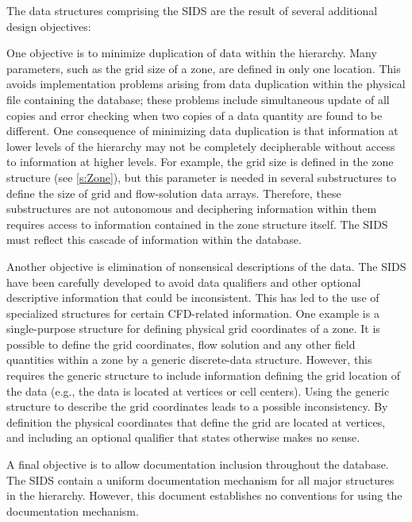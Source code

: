 The data structures comprising the SIDS are the result of several
additional design objectives:

One objective is to minimize duplication of data within the hierarchy.
Many parameters, such as the grid size of a zone, are defined in only
one location.  This avoids implementation problems arising from data
duplication within the physical file containing the database; these
problems include simultaneous update of all copies and error checking
when two copies of a data quantity are found to be different.  One
consequence of minimizing data duplication is that information at lower
levels of the hierarchy may not be completely decipherable without
access to information at higher levels.  For example, the grid size
is defined in the zone structure (see \autoref{s:Zone}), but this
parameter is needed in several substructures to define the size of grid
and flow-solution data arrays.  Therefore, these substructures are not
autonomous and deciphering information within them requires access to
information contained in the zone structure itself.  The SIDS must
reflect this cascade of information within the database.

Another objective is elimination of nonsensical descriptions of
the data.  The SIDS have been carefully developed to avoid data
qualifiers and other optional descriptive information that could be
inconsistent.  This has led to the use of specialized structures for
certain CFD-related information.  One example is a single-purpose
structure for defining physical grid coordinates of a zone.  It is
possible to define the grid coordinates, flow solution and any other
field quantities within a zone by a generic discrete-data structure.
However, this requires the generic structure to include information
defining the grid location of the data (e.g., the data is located at
vertices or cell centers).  Using the generic structure to describe the
grid coordinates leads to a possible inconsistency.  By definition the
physical coordinates that define the grid are located at vertices, and
including an optional qualifier that states otherwise makes no sense.

A final objective is to allow documentation inclusion throughout the
database.  The SIDS contain a uniform documentation mechanism for all
major structures in the hierarchy.  However, this document establishes
no conventions for using the documentation mechanism.
